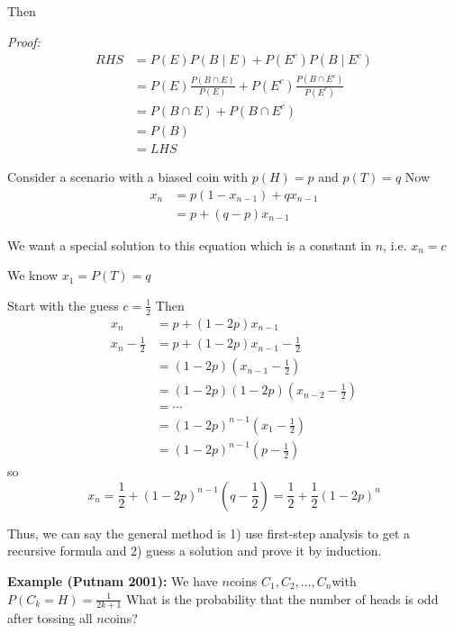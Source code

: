 \documentclass[12pt]{article}
\newenvironment*{tbox}[2][gray]{
    \begin{tcolorbox}[
        parbox=false,
        colback=#1!5!white,
        colframe=#1!75!black,
        breakable,
        title={#2}
    ]}
    {\end{tcolorbox}}
\begin{document}
    Then 
    \begin{tbox}{\textbf{Law of total Probability:}
        \[P(B) = P(E) P(B \; | \; E) + P(E^c)P(B \; | \; E^c)\]}
        \emph{Proof:} 
        \begin{align*}
            RHS &= P(E)P(B \; | \; E) + P(E^c)P(B \; | \; E^c)\\
            &= P(E)\frac{P(B \cap E)}{P(E)} + P(E^c)\frac{P(B \cap E^c)}{P(E^c)}\\
            &= P(B \cap E) + P(B \cap E^c)\\
            &= P(B)\\ 
            &= LHS
        \end{align*}
    \end{tbox}

    Consider a scenario with a biased coin with $p(H) = p$ and $p(T) = q$ Now 
    \begin{align*}
        x_n &= p(1 - x_{n-1}) + qx_{n-1}\\ 
        &= p + (q - p)x_{n-1}
    \end{align*}

    We want a special solution to this equation which is a constant in $n$, i.e. $x_n = c$ 

    We know $x_1 = P(T) = q$ 

    Start with the guess $c = \frac{1}{2}$ Then 
    \begin{align*}
        x_n &= p + (1 - 2p)x_{n-1}\\
        x_n - \frac{1}{2} &= p + (1 - 2p)x_{n-1} - \frac{1}{2}\\ 
        &= (1 - 2p)(x_{n-1} - \frac{1}{2})\\ 
        &= (1 - 2p)(1 - 2p)(x_{n-2} - \frac{1}{2})\\ 
        &= \cdots\\
        &= (1 - 2p)^{n-1}(x_1 - \frac{1}{2})\\
        &= (1 - 2p)^{n-1}(p - \frac{1}{2})
    \end{align*}
    so 
    \[\boxed{x_n = \frac{1}{2} + (1 - 2p)^{n-1}(q - \frac{1}{2}) = \frac{1}{2} + \frac{1}{2}(1 - 2p)^n}\]

    Thus, we can say the general method is 1) use first-step analysis to get a recursive formula and 2) guess a solution and prove it by induction.

    \textbf{Example (Putnam 2001):} We have $n$coins $C_1, C_2, \ldots, C_n$with $P(C_k = H) = \frac{1}{2k + 1}$ What is the probability that the number of heads is odd after tossing all $n$coins?
\end{document}
